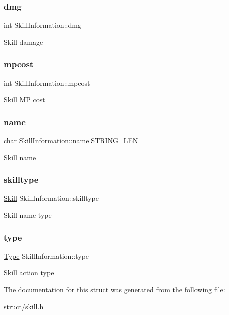 \subsubsection{\texorpdfstring{dmg}{dmg}}
{\footnotesize\ttfamily int Skill\+Information\+::dmg}

Skill damage \mbox{\label{structSkillInformation_a2e2586c2d8ef65c15b50380a04e1f473}} 
\subsubsection{\texorpdfstring{mpcost}{mpcost}}
{\footnotesize\ttfamily int Skill\+Information\+::mpcost}

Skill MP cost \mbox{\label{structSkillInformation_a0bc25f02bc205637e32c7a29c2f2cbf6}} 
\subsubsection{\texorpdfstring{name}{name}}
{\footnotesize\ttfamily char Skill\+Information\+::name\mbox{[}\hyperlink{user_8h_ad6d94ce273637446121c9cbd16b6077f}{S\+T\+R\+I\+N\+G\+\_\+\+L\+EN}\mbox{]}}

Skill name \mbox{\label{structSkillInformation_ae5b5ea839058608f659c16fb6895c472}} 
\subsubsection{\texorpdfstring{skilltype}{skilltype}}
{\footnotesize\ttfamily \hyperlink{skill_8h_a53d804c2b0df9ad8b7f77f8c1ee82392}{Skill} Skill\+Information\+::skilltype}

Skill name type \mbox{\label{structSkillInformation_af59700d7ac0a0bf817972b829f488d95}} 
\subsubsection{\texorpdfstring{type}{type}}
{\footnotesize\ttfamily \hyperlink{skill_8h_a1d1cfd8ffb84e947f82999c682b666a7}{Type} Skill\+Information\+::type}

Skill action type 

The documentation for this struct was generated from the following file\+:\begin{DoxyCompactItemize}
\item 
struct/\hyperlink{skill_8h}{skill.\+h}\end{DoxyCompactItemize}
